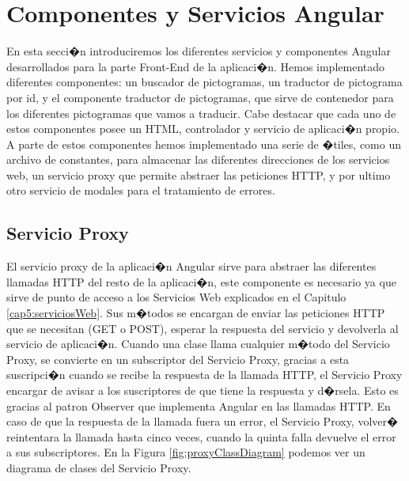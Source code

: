 \section{Componentes y Servicios Angular}
\label{cap5:sec:ComponentesAngular}

En esta secci�n introduciremos los diferentes servicios y componentes Angular desarrollados para la parte Front-End de la aplicaci�n. Hemos implementado diferentes componentes: un buscador de pictogramas, un traductor de pictograma por id, y el componente traductor de pictogramas, que sirve de contenedor para los diferentes pictogramas que vamos a traducir. Cabe destacar que cada uno de estos componentes posee un HTML, controlador y servicio de aplicaci�n propio.  A parte de estos componentes hemos implementado una serie de �tiles, como un archivo de constantes, para almacenar las diferentes direcciones de los servicios web, un servicio proxy que permite abstraer las peticiones HTTP, y por ultimo otro servicio de modales para el tratamiento de errores.


\subsection{Servicio Proxy}

El servicio proxy de la aplicaci�n Angular sirve para abstraer las diferentes llamadas HTTP del resto de la aplicaci�n, este componente es necesario ya que sirve de punto de acceso a los Servicios Web explicados en el Capitulo \ref{cap5:serviciosWeb}. Sus m�todos se encargan de enviar las peticiones HTTP que se necesitan (GET o POST), esperar la respuesta del servicio y devolverla al servicio de aplicaci�n.
Cuando una clase llama cualquier m�todo del Servicio Proxy, se convierte en un subscriptor del Servicio Proxy, gracias a esta suscripci�n cuando se recibe la respuesta de la llamada HTTP, el Servicio Proxy encargar de avisar a los suscriptores de que tiene la respuesta y d�rsela. Esto es gracias al patron Observer que implementa Angular en las llamadas HTTP. En caso de que la respuesta de la llamada fuera un error, el Servicio Proxy, volver� reintentara la llamada hasta cinco veces, cuando la quinta falla devuelve el error a sus subscriptores. En la Figura \ref{fig:proxyClassDiagram} podemos ver un diagrama de clases del Servicio Proxy.


